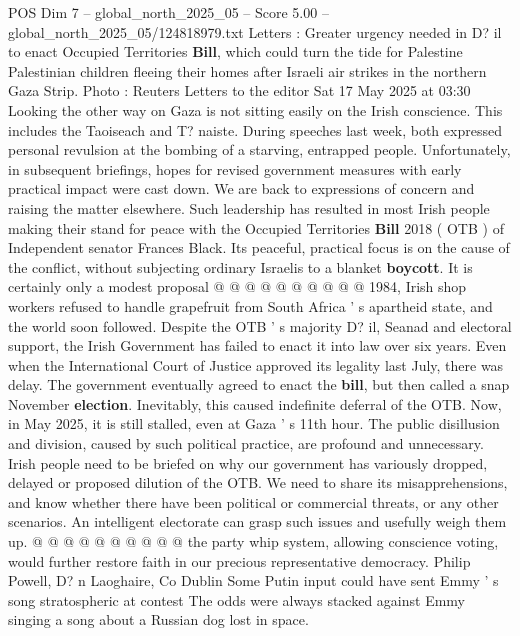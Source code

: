 \begin{textsample}{POS Dim 7 – global\_north\_2025\_05 – Score 5.00 – global\_north\_2025\_05/124818979.txt}  \label{ex:f7_pos_332}
Letters : Greater urgency needed in D? il to enact Occupied Territories \textbf{Bill}, which could turn the tide for Palestine Palestinian children fleeing their homes after Israeli air strikes in the northern Gaza Strip.
Photo : Reuters Letters to the editor Sat 17 May 2025 at 03:30 Looking the other way on Gaza is not sitting easily on the Irish conscience.
This includes the Taoiseach and T? naiste.
During speeches last week, both expressed personal revulsion at the bombing of a starving, entrapped people.
Unfortunately, in subsequent briefings, hopes for revised government measures with early practical impact were cast down.
We are back to expressions of concern and raising the matter elsewhere.
Such leadership has resulted in most Irish people making their stand for peace with the Occupied Territories \textbf{Bill} 2018 ( OTB ) of Independent senator Frances Black.
Its peaceful, practical focus is on the cause of the conflict, without subjecting ordinary Israelis to a blanket \textbf{boycott}.
It is certainly only a modest proposal @ @ @ @ @ @ @ @ @ @ 1984, Irish shop workers refused to handle grapefruit from South Africa ' s apartheid state, and the world soon followed.
Despite the OTB ' s majority D? il, Seanad and electoral support, the Irish Government has failed to enact it into law over six years.
Even when the International Court of Justice approved its legality last July, there was delay.
The government eventually agreed to enact the \textbf{bill}, but then called a snap November \textbf{election}.
Inevitably, this caused indefinite deferral of the OTB.
Now, in May 2025, it is still stalled, even at Gaza ' s 11th hour.
The public disillusion and division, caused by such political practice, are profound and unnecessary.
Irish people need to be briefed on why our government has variously dropped, delayed or proposed dilution of the OTB.
We need to share its misapprehensions, and know whether there have been political or commercial threats, or any other scenarios.
An intelligent electorate can grasp such issues and usefully weigh them up. @ @ @ @ @ @ @ @ @ @ the party whip system, allowing conscience voting, would further restore faith in our precious representative democracy.
Philip Powell, D? n Laoghaire, Co Dublin Some Putin input could have sent Emmy ' s song stratospheric at contest The odds were always stacked against Emmy singing a song about a Russian dog lost in space.

\end{textsample}
